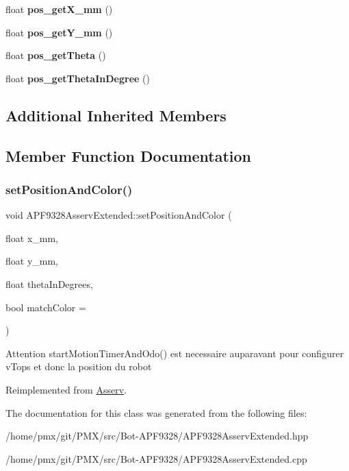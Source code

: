\begin{DoxyCompactItemize}
float {\bfseries pos\+\_\+get\+X\+\_\+mm} ()
\item 
\mbox{\label{classAPF9328AsservExtended_a5d1e08d7288e1850899705626d826508}} 
float {\bfseries pos\+\_\+get\+Y\+\_\+mm} ()
\item 
\mbox{\label{classAPF9328AsservExtended_ab7312a711b88f3cb55fe42c6bbfd2edd}} 
float {\bfseries pos\+\_\+get\+Theta} ()
\item 
\mbox{\label{classAPF9328AsservExtended_a97d08816e43054d43cdab58e1e826d12}} 
float {\bfseries pos\+\_\+get\+Theta\+In\+Degree} ()
\end{DoxyCompactItemize}
\subsection*{Additional Inherited Members}


\subsection{Member Function Documentation}
\mbox{\label{classAPF9328AsservExtended_ad4c9b6504309467b4f1c820fb3202b12}} 
\subsubsection{\texorpdfstring{set\+Position\+And\+Color()}{setPositionAndColor()}}
{\footnotesize\ttfamily void A\+P\+F9328\+Asserv\+Extended\+::set\+Position\+And\+Color (\begin{DoxyParamCaption}\item[{float}]{x\+\_\+mm,  }\item[{float}]{y\+\_\+mm,  }\item[{float}]{theta\+In\+Degrees,  }\item[{bool}]{match\+Color = {} }\end{DoxyParamCaption})\hspace{0.3cm}{\ttfamily [virtual]}}

Attention start\+Motion\+Timer\+And\+Odo() est necessaire auparavant pour configurer v\+Tops et donc la position du robot 

Reimplemented from \hyperlink{classAsserv}{Asserv}.



The documentation for this class was generated from the following files\+:\begin{DoxyCompactItemize}
\item 
/home/pmx/git/\+P\+M\+X/src/\+Bot-\/\+A\+P\+F9328/A\+P\+F9328\+Asserv\+Extended.\+hpp\item 
/home/pmx/git/\+P\+M\+X/src/\+Bot-\/\+A\+P\+F9328/A\+P\+F9328\+Asserv\+Extended.\+cpp\end{DoxyCompactItemize}
